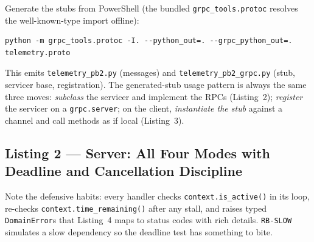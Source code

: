Generate the stubs from PowerShell (the bundled \texttt{grpc\_tools.protoc}
resolves the well-known-type import offline):

\begin{verbatim}
python -m grpc_tools.protoc -I. --python_out=. --grpc_python_out=. telemetry.proto
\end{verbatim}

This emits \texttt{telemetry\_pb2.py} (messages) and
\texttt{telemetry\_pb2\_grpc.py} (stub, servicer base, registration). The
generated-stub usage pattern is always the same three moves:
\emph{subclass} the servicer and implement the RPCs (Listing~2);
\emph{register} the servicer on a \texttt{grpc.server}; on the client,
\emph{instantiate the stub} against a channel and call methods as if local
(Listing~3).

\subsection{Listing 2 --- Server: All Four Modes with Deadline and Cancellation Discipline}
\label{subsec:ch13-code-server}

Note the defensive habits: every handler checks \texttt{context.is\_active()}
in its loop, re-checks \texttt{context.time\_remaining()} after any stall, and
raises typed \texttt{DomainError}s that Listing~4 maps to status codes with
rich details. \texttt{RB-SLOW} simulates a slow dependency so the deadline test
has something to bite.

